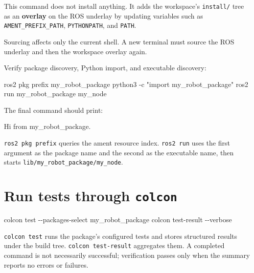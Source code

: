 \documentclass[
  australian,
  12pt,
  letterpaper,
  DIV=11,
  numbers=noendperiod,
  twoside]{scrreprt}
\newenvironment{Shaded}{\begin{snugshade}}{\end{snugshade}}
\newcommand{\AttributeTok}[1]{\textcolor[rgb]{0.40,0.45,0.13}{#1}}
\newcommand{\ExtensionTok}[1]{\textcolor[rgb]{0.00,0.23,0.31}{#1}}
\newcommand{\NormalTok}[1]{\textcolor[rgb]{0.00,0.23,0.31}{#1}}
\newcommand{\StringTok}[1]{\textcolor[rgb]{0.13,0.47,0.30}{#1}}
\begin{document}
This command does not install anything. It adds the workspace's
\texttt{install/} tree as an \textbf{overlay} on the ROS underlay by
updating variables such as \texttt{AMENT\_PREFIX\_PATH},
\texttt{PYTHONPATH}, and \texttt{PATH}.

Sourcing affects only the current shell. A new terminal must source the
ROS underlay and then the workspace overlay again.

Verify package discovery, Python import, and executable discovery:

\begin{Shaded}
\begin{Highlighting}[]
\ExtensionTok{ros2}\NormalTok{ pkg prefix my\_robot\_package}
\ExtensionTok{python3} \AttributeTok{{-}c} \StringTok{"import my\_robot\_package"}
\ExtensionTok{ros2}\NormalTok{ run my\_robot\_package my\_node}
\end{Highlighting}
\end{Shaded}

The final command should print:

\begin{Shaded}
\begin{Highlighting}[]
\NormalTok{Hi from my\_robot\_package.}
\end{Highlighting}
\end{Shaded}

\texttt{ros2\ pkg\ prefix} queries the ament resource index.
\texttt{ros2\ run} uses the first argument as the package name and the
second as the executable name, then starts
\texttt{lib/my\_robot\_package/my\_node}.

\section{\texorpdfstring{Run tests through
\texttt{colcon}}{Run tests through colcon}}\label{run-tests-through-colcon}

\begin{Shaded}
\begin{Highlighting}[]
\ExtensionTok{colcon}\NormalTok{ test }\AttributeTok{{-}{-}packages{-}select}\NormalTok{ my\_robot\_package}
\ExtensionTok{colcon}\NormalTok{ test{-}result }\AttributeTok{{-}{-}verbose}
\end{Highlighting}
\end{Shaded}

\texttt{colcon\ test} runs the package's configured tests and stores
structured results under the build tree. \texttt{colcon\ test-result}
aggregates them. A completed command is not necessarily successful;
verification passes only when the summary reports no errors or failures.
\end{document}
